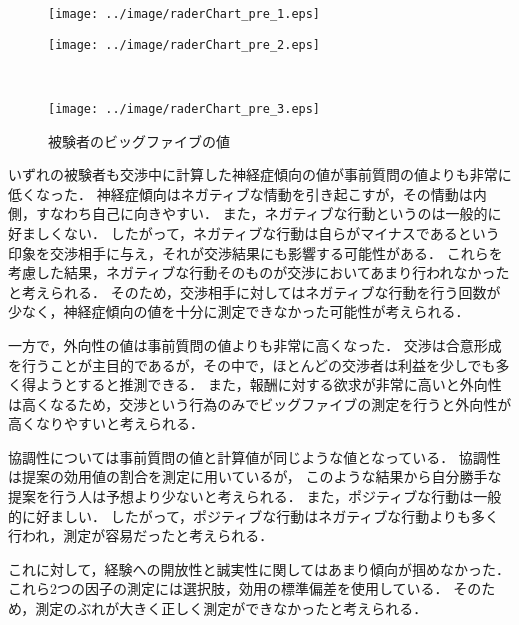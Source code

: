 \begin{figure}[bt]
    \begin{minipage}[b]{0.47\linewidth}
        \centering
        \texttt{[image: ../image/raderChart\_pre\_1.eps]}
        \label{fig:pre_big5_sub1}
    \end{minipage}
    \begin{minipage}[b]{0.47\linewidth}
        \centering
        \texttt{[image: ../image/raderChart\_pre\_2.eps]}
        \label{fig:pre_big5_sub2}
    \end{minipage}\\
    \begin{center}
        \begin{minipage}[b]{0.47\linewidth}
            \centering
            \texttt{[image: ../image/raderChart\_pre\_3.eps]}
            \label{fig:pre_big5_sub3}
        \end{minipage}
    \end{center}
    \caption{被験者のビッグファイブの値}\label{fig:pre_big5}
\end{figure}

いずれの被験者も交渉中に計算した神経症傾向の値が事前質問の値よりも非常に低くなった．
神経症傾向はネガティブな情動を引き起こすが，その情動は内側，すなわち自己に向きやすい．
また，ネガティブな行動というのは一般的に好ましくない．
したがって，ネガティブな行動は自らがマイナスであるという印象を交渉相手に与え，それが交渉結果にも影響する可能性がある．
これらを考慮した結果，ネガティブな行動そのものが交渉においてあまり行われなかったと考えられる．
そのため，交渉相手に対してはネガティブな行動を行う回数が少なく，神経症傾向の値を十分に測定できなかった可能性が考えられる．

一方で，外向性の値は事前質問の値よりも非常に高くなった．
交渉は合意形成を行うことが主目的であるが，その中で，ほとんどの交渉者は利益を少しでも多く得ようとすると推測できる．
また，報酬に対する欲求が非常に高いと外向性は高くなるため，交渉という行為のみでビッグファイブの測定を行うと外向性が高くなりやすいと考えられる．

協調性については事前質問の値と計算値が同じような値となっている．
協調性は提案の効用値の割合を測定に用いているが，
このような結果から自分勝手な提案を行う人は予想より少ないと考えられる．
また，ポジティブな行動は一般的に好ましい．
したがって，ポジティブな行動はネガティブな行動よりも多く行われ，測定が容易だったと考えられる．

これに対して，経験への開放性と誠実性に関してはあまり傾向が掴めなかった．
これら2つの因子の測定には選択肢，効用の標準偏差を使用している．
そのため，測定のぶれが大きく正しく測定ができなかったと考えられる．

